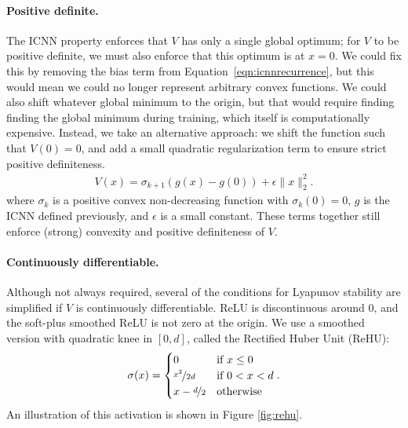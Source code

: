 \paragraph{Positive definite.} The ICNN property enforces that $V$ has only a single global optimum; for $V$ to be positive definite, we must also enforce that this optimum is at $x = 0$. We could fix this by removing the bias term from Equation~\ref{eqn:icnnrecurrence}, but this would mean we could no longer represent arbitrary convex functions. We could also shift whatever global minimum to the origin, but that would require finding finding the global minimum during training, which itself is computationally expensive. Instead, we take an alternative approach: we shift the function such that $V(0) = 0$, and add a small quadratic regularization term to ensure strict positive definiteness.
\begin{align}
	V(x) = \sigma_{k+1}(g(x) - g(0)) + \epsilon \|x\|_2^2.
	\label{eq:V_definition}
\end{align}
where $\sigma_k$ is a positive convex non-decreasing function with $\sigma_k(0) = 0$, $g$ is the ICNN defined previously, and $\epsilon$ is a small constant.  These terms together still enforce (strong) convexity and positive definiteness of $V$.


\paragraph{Continuously differentiable.}  Although not always required, several of the conditions for Lyapunov stability are simplified if $V$ is continuously differentiable. ReLU is discontinuous around 0, and the soft-plus smoothed ReLU is not zero at the origin. We use a smoothed version with quadratic knee in $[0, d]$, called the Rectified Huber Unit (ReHU):
\begin{align}
	\sigma(x) = \begin{cases} 0                   & \mbox {if } x \leq 0 \\
              \nicefrac{x^2}{2d}  & \mbox{if } 0 < x < d \\
              x - \nicefrac{d}{2} & \mbox{otherwise}\end{cases}.
\end{align}
An illustration of this activation is shown in Figure \ref{fig:rehu}.

